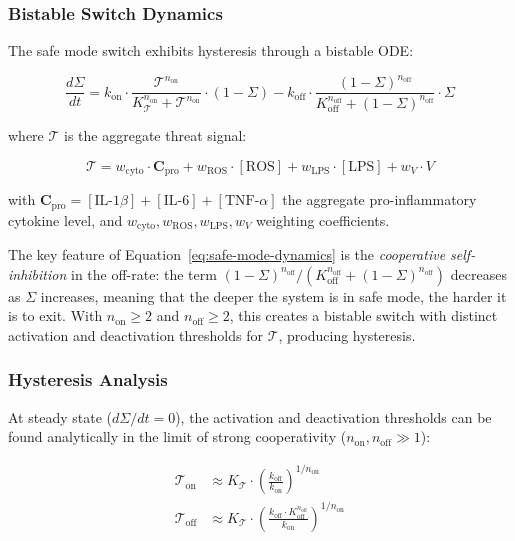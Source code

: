 \subsubsection{Bistable Switch Dynamics}

The safe mode switch exhibits hysteresis through a bistable ODE:

\begin{equation}
\label{eq:safe-mode-dynamics}
\frac{d\Sigma}{dt} = k_{\text{on}} \cdot \frac{\mathcal{T}^{n_{\text{on}}}}{K_{\mathcal{T}}^{n_{\text{on}}} + \mathcal{T}^{n_{\text{on}}}} \cdot (1 - \Sigma) - k_{\text{off}} \cdot \frac{(1 - \Sigma)^{n_{\text{off}}}}{K_{\text{off}}^{n_{\text{off}}} + (1 - \Sigma)^{n_{\text{off}}}} \cdot \Sigma
\end{equation}

where $\mathcal{T}$ is the aggregate threat signal:

\begin{equation}
\label{eq:threat-signal}
\mathcal{T} = w_{\text{cyto}} \cdot \boldsymbol{C}_{\text{pro}} + w_{\text{ROS}} \cdot [\text{ROS}] + w_{\text{LPS}} \cdot [\text{LPS}] + w_V \cdot V
\end{equation}

with $\boldsymbol{C}_{\text{pro}} = [\text{IL-1}\beta] + [\text{IL-6}] + [\text{TNF-}\alpha]$ the aggregate pro-inflammatory cytokine level, and $w_{\text{cyto}}, w_{\text{ROS}}, w_{\text{LPS}}, w_V$ weighting coefficients.

The key feature of Equation~\ref{eq:safe-mode-dynamics} is the \emph{cooperative self-inhibition} in the off-rate: the term $(1 - \Sigma)^{n_{\text{off}}}/(K_{\text{off}}^{n_{\text{off}}} + (1 - \Sigma)^{n_{\text{off}}})$ decreases as $\Sigma$ increases, meaning that the deeper the system is in safe mode, the harder it is to exit. With $n_{\text{on}} \geq 2$ and $n_{\text{off}} \geq 2$, this creates a bistable switch with distinct activation and deactivation thresholds for $\mathcal{T}$, producing hysteresis.

\subsubsection{Hysteresis Analysis}

At steady state ($d\Sigma/dt = 0$), the activation and deactivation thresholds can be found analytically in the limit of strong cooperativity ($n_{\text{on}}, n_{\text{off}} \gg 1$):

\begin{align}
\label{eq:safe-mode-thresholds}
\mathcal{T}_{\text{on}} &\approx K_{\mathcal{T}} \cdot \left(\frac{k_{\text{off}}}{k_{\text{on}}}\right)^{1/n_{\text{on}}} \\
\mathcal{T}_{\text{off}} &\approx K_{\mathcal{T}} \cdot \left(\frac{k_{\text{off}} \cdot K_{\text{off}}^{n_{\text{off}}}}{k_{\text{on}}}\right)^{1/n_{\text{on}}}
\end{align}


